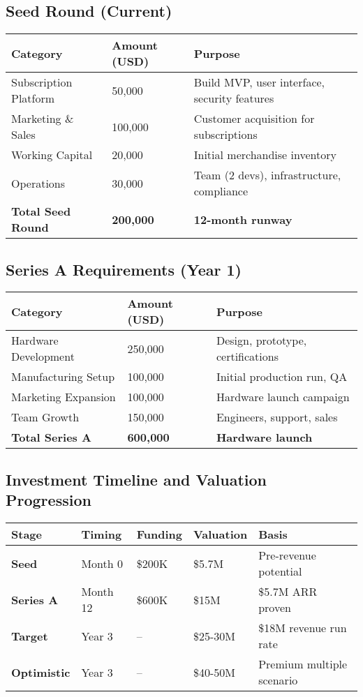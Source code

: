 \documentclass[11pt]{article}
\begin{document}
\subsection{Seed Round (Current)}
\begin{table}[H]
\centering
\begin{tabularx}{\linewidth}{l Y Y}
\toprule
Category & Amount (USD) & Purpose \\\midrule
Subscription Platform & 50,000 & Build MVP, user interface, security features \\
Marketing \& Sales & 100,000 & Customer acquisition for subscriptions \\
Working Capital & 20,000 & Initial merchandise inventory \\
Operations & 30,000 & Team (2 devs), infrastructure, compliance \\
\textbf{Total Seed Round} & \textbf{200,000} & \textbf{12-month runway} \\
\bottomrule
\end{tabularx}
\end{table}

\subsection{Series A Requirements (Year 1)}
\begin{table}[H]
\centering
\begin{tabularx}{\linewidth}{l Y Y}
\toprule
Category & Amount (USD) & Purpose \\\midrule
Hardware Development & 250,000 & Design, prototype, certifications \\
Manufacturing Setup & 100,000 & Initial production run, QA \\
Marketing Expansion & 100,000 & Hardware launch campaign \\
Team Growth & 150,000 & Engineers, support, sales \\
\textbf{Total Series A} & \textbf{600,000} & \textbf{Hardware launch} \\
\bottomrule
\end{tabularx}
\end{table}

\subsection{Investment Timeline and Valuation Progression}
\begin{table}[H]
\centering
\begin{tabularx}{\linewidth}{l Y Y Y Y}
\toprule
Stage & Timing & Funding & Valuation & Basis \\\midrule
\textbf{Seed} & Month 0 & \$200K & \$5.7M & Pre-revenue potential \\
\textbf{Series A} & Month 12 & \$600K & \$15M & \$5.7M ARR proven \\
\textbf{Target} & Year 3 & -- & \$25-30M & \$18M revenue run rate \\
\textbf{Optimistic} & Year 3 & -- & \$40-50M & Premium multiple scenario \\
\bottomrule
\end{tabularx}
\end{table}
\end{document}
